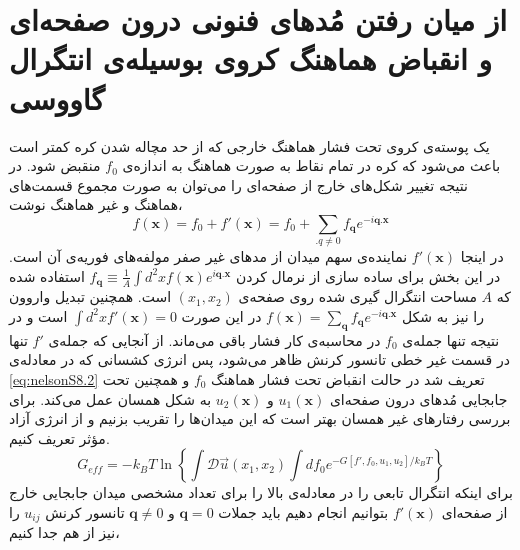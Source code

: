\section{
از میان رفتن مُدهای فنونی درون صفحه‌ای و انقباض هماهنگ کروی بوسیله‌ی انتگرال گاووسی
}
یک پوسته‌ی کروی تحت فشار هماهنگ خارجی که از حد مچاله شدن کره
کمتر است باعث می‌شود که کره در تمام نقاط به صورت هماهنگ به اندازه‌ی $f_0$ منقبض شود. در نتیجه‌ تغییر شکل‌های خارج از صفحه‌ای را می‌توان به صورت مجموع قسمت‌های هماهنگ و غیر هماهنگ نوشت،
\begin{equation}
f(\boldsymbol x)=f_0+f'(\boldsymbol x) = f_0+\sum_{\boldsymbol . q\neq0}f_{\boldsymbol q}e^{-i\boldsymbol q.\boldsymbol x}
\label{eq:nelsonS10}
\end{equation}
در اینجا $f'(\boldsymbol x)$ 
نماینده‌ی سهم میدان از مد‌های غیر صفر مولفه‌های فوریه‌ی آن است. در این بخش برای ساده سازی از نرمال کردن 
$f_{\boldsymbol q} \equiv \frac{1}{A}\int d^2xf(\boldsymbol x) e^{i\boldsymbol q.\boldsymbol x}$
استفاده شده که $A$ مساحت انتگرال گیری شده روی صفحه‌ی $(x_1,x_2)$ است. همچنین تبدیل واروون را نیز به شکل 
$f(\boldsymbol x) = \sum_{\boldsymbol q}f_{\boldsymbol q}e^{-i\boldsymbol q.\boldsymbol x}$
در این صورت 
$\int d^2xf'(\boldsymbol x)=0$
است و در نتیجه تنها جمله‌‌ی $f_0$ در محاسبه‌ی کار فشار باقی می‌ماند. از آنجایی که جمله‌ی $f'$ تنها در قسمت غیر خطی تانسور کرنش ظاهر می‌شود، پس انرژی کشسانی که در معادله‌ی \ref{eq:nelsonS8.2} تعریف شد در حالت انقباض تحت فشار هماهنگ $f_0$ و همچنین تحت جابجایی مُدهای درون صفحه‌ای $u_1(\boldsymbol x)$ و $u_2(\boldsymbol x)$ به شکل همسان
 عمل می‌کند. برای بررسی رفتارهای غیر همسان بهتر است که این میدان‌ها را تقریب بزنیم و از انرژی آزاد مؤثر تعریف کنیم.
 \begin{equation}
G_{eff}=-k_BT\ln\left\{\int\mathcal D\vec u(x_1,x_2)\int df_0e^{-G[f',f_0,u_1,u_2]/k_BT}\right\}
\label{eq:nelsonS11}
\end{equation}
برای اینکه انتگرال تابعی را در معادله‌ی بالا را برای تعداد مشخصی میدان جابجایی خارج از صفحه‌ای $f'(\boldsymbol x)$ بتوانیم انجام دهیم باید جملات $\boldsymbol q = 0$ و $\boldsymbol q \neq 0$ تانسور کرنش $u_{ij}$ 
را نیز از هم جدا کنیم،

